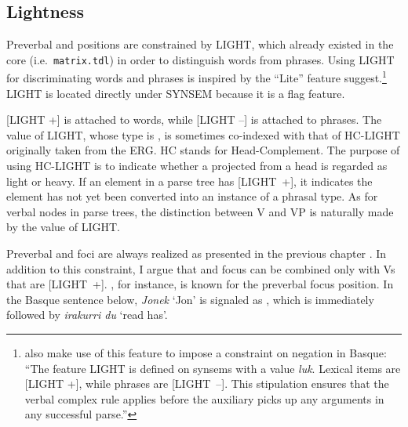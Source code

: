 \subsection{Lightness}
\label{9:ssec:lightness}


Preverbal and   positions are constrained by
LIGHT, which already existed in the \lingo {} core (i.e.\ \texttt{matrix.tdl}) in order to distinguish
words from phrases. Using LIGHT for discriminating words
and phrases is inspired by the ``Lite'' feature
\citet{abeille:godard:01}
suggest.\footnote{\citet[54]{crowgey:bender:11} also make use of
  this feature to impose a constraint on negation in
  Basque: ``The feature LIGHT is defined on synsems with
  a value \textit{luk}. Lexical items are [LIGHT +], while phrases are
  \mbox{[LIGHT --]}. This stipulation ensures that the verbal complex
  rule applies before the auxiliary picks up any arguments in any
  successful parse.''} LIGHT is located directly under
SYNSEM because it is a flag feature.


[LIGHT +] is attached to words, while [LIGHT --] is attached to
phrases. The value of LIGHT, whose type is , is sometimes
co-indexed with that of HC-LIGHT originally taken from the ERG. HC
stands for Head-Complement. The purpose of using HC-LIGHT is to
indicate whether a  projected from a head is
regarded as light or heavy. If an element in a parse tree has
\mbox{[LIGHT +]}, it indicates the element has not yet
been converted into an instance of a phrasal type. As for verbal nodes
in parse trees, the distinction between V and VP is naturally made by
the value of LIGHT.



Preverbal and  foci are always realized as
 presented in the previous
chapter . In addition to this
constraint, I argue that  and  focus
can be combined only with Vs that are \mbox{[LIGHT +]}.  ,
for instance, is known for the preverbal focus position.  In the
Basque sentence below, \textit{Jonek} `Jon' is signaled as
, which is immediately followed by \textit{irakurri du}
`read has'.








